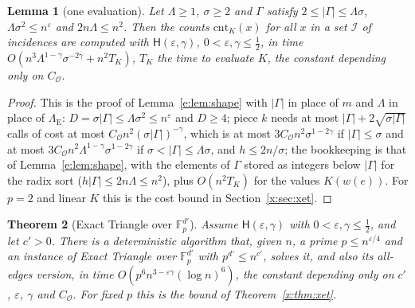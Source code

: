 \documentclass[11pt]{article}
\newtheorem{theorem}{Theorem}[section]
\newtheorem{lemma}[theorem]{Lemma}
\theoremstyle{definition}
\theoremstyle{remark}
\newcommand{\Fp}{\mathbb{F}_p}
\newcommand{\eps}{\varepsilon}
\newcommand{\cnt}{\mathrm{cnt}}
\newcommand{\Iq}{\mathcal{I}}
\newcommand{\Hyp}{\mathsf{H}}
\begin{document}
\begin{lemma}[one evaluation]\label{g:lem:trieval}
Let $\Lambda\ge1$, $\sigma\ge2$ and $\Gamma$ satisfy $2\le|\Gamma|\le\Lambda\sigma$, $\Lambda\sigma^2\le n^\eps$ and $2n\Lambda\le n^2$. Then the counts $\cnt_K(x)$ for all $x$ in a set $\Iq$ of incidences are computed with $\Hyp(\eps,\gamma)$, $0<\eps,\gamma\le\frac12$, in time $O(n^3\Lambda^{1-\gamma}\sigma^{-2\gamma}+n^2T_K)$, $T_K$ the time to evaluate $K$, the constant depending only on $C_{\mathcal O}$.
\end{lemma}

\begin{proof}
This is the proof of Lemma~\ref{e:lem:shape} with $|\Gamma|$ in place of $m$ and $\Lambda$ in place of $\Lambda_{\mathrm E}$: $D=\sigma|\Gamma|\le\Lambda\sigma^2\le n^\eps$ and $D\ge4$; piece $k$ needs at most $|\Gamma|+2\sqrt{\sigma|\Gamma|}$ calls of cost at most $C_{\mathcal O}n^2(\sigma|\Gamma|)^{-\gamma}$, which is at most $3C_{\mathcal O}n^2\sigma^{1-2\gamma}$ if $|\Gamma|\le\sigma$ and at most $3C_{\mathcal O}n^2\Lambda^{1-\gamma}\sigma^{1-2\gamma}$ if $\sigma<|\Gamma|\le\Lambda\sigma$, and $h\le2n/\sigma$; the bookkeeping is that of Lemma~\ref{e:lem:shape}, with the elements of $\Gamma$ stored as integers below $|\Gamma|$ for the radix sort ($h|\Gamma|\le2n\Lambda\le n^2$), plus $O(n^2T_K)$ for the values $K(w(e))$. For $p=2$ and linear $K$ this is the cost bound in Section~\ref{x:sec:xet}.
\end{proof}

\begin{theorem}[Exact Triangle over $\Fp^{d'}$]\label{g:thm:triFp}
Assume $\Hyp(\eps,\gamma)$ with $0<\eps,\gamma\le\frac12$, and let $c'>0$. There is a deterministic algorithm that, given $n$, a prime $p\le n^{\eps/4}$ and an instance of Exact Triangle over $\Fp^{d'}$ with $p^{d'}\le n^{c'}$, solves it, and also its all-edges version, in time $O(p^6n^{3-\eps\gamma}(\log n)^6)$, the constant depending only on $c'$, $\eps$, $\gamma$ and $C_{\mathcal O}$. For fixed $p$ this is the bound of Theorem~\ref{x:thm:xet}.
\end{theorem}
\end{document}
